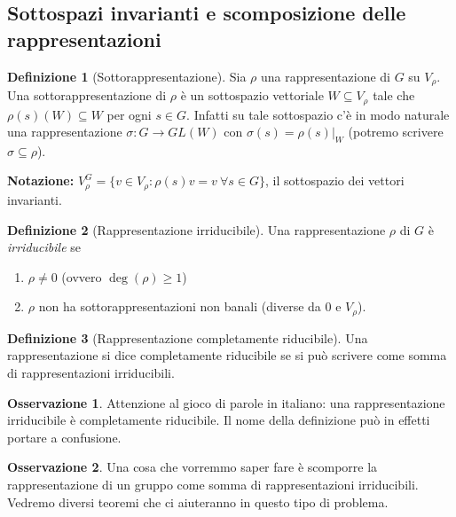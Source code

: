 \documentclass[11pt]{article}
\theoremstyle{plain}
\theoremstyle{definition}
\newtheorem{defn}{Definizione}[section]
\newtheorem*{rem}{Osservazione}
\theoremstyle{remark}
\begin{document}
\subsection{Sottospazi invarianti e scomposizione delle rappresentazioni}



\begin{defn}[Sottorappresentazione]
Sia $\rho$ una rappresentazione di $G$ su $V_{\rho}$. Una sottorappresentazione di $\rho$ è un sottospazio vettoriale $W\subseteq V_{\rho}$ tale che $\rho(s)(W)\subseteq W$ per ogni $s\in G$. Infatti su tale sottospazio c'è in modo naturale una rappresentazione $\sigma:G\to GL(W)$ con $\sigma(s)=\rho(s)|_W$ (potremo scrivere $\sigma\subseteq \rho$).
\end{defn}

\textbf{Notazione:} $V_{\rho}^G=\{v\in V_{\rho}: \rho(s)v=v\ \forall s\in G\}$, il sottospazio dei vettori invarianti.


\begin{defn}[Rappresentazione irriducibile]
Una rappresentazione $\rho$ di $G$ è \textit{irriducibile} se
\begin{enumerate}
	\item $\rho \neq 0$ (ovvero $\deg(\rho) \geq 1$)
	\item $\rho$ non ha sottorappresentazioni non banali (diverse da 0 e $V_{\rho}$).
\end{enumerate}

\end{defn}


\begin{defn}[Rappresentazione completamente riducibile]
Una rappresentazione si dice completamente riducibile se si può scrivere come somma di rappresentazioni irriducibili.
\end{defn}


\begin{rem}
Attenzione al gioco di parole in italiano: una rappresentazione irriducibile è completamente riducibile. Il nome della definizione può in effetti portare a confusione.
\end{rem}


\begin{rem} Una cosa che vorremmo saper fare è scomporre la rappresentazione di un gruppo come somma di rappresentazioni irriducibili. Vedremo diversi teoremi che ci aiuteranno in questo tipo di problema.
\end{rem}
\end{document}
